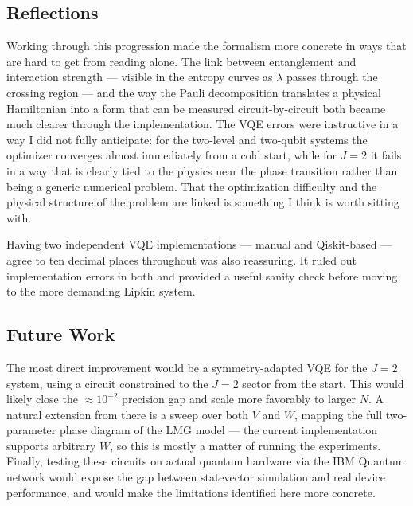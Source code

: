 \subsection{Reflections}
\label{subsec:conclusion-reflections}

Working through this progression made the formalism more concrete in ways that are hard to get from reading alone. The link between entanglement and interaction strength — visible in the entropy curves as $\lambda$ passes through the crossing region — and the way the Pauli decomposition translates a physical Hamiltonian into a form that can be measured circuit-by-circuit both became much clearer through the implementation. The VQE errors were instructive in a way I did not fully anticipate: for the two-level and two-qubit systems the optimizer converges almost immediately from a cold start, while for $J=2$ it fails in a way that is clearly tied to the physics near the phase transition rather than being a generic numerical problem. That the optimization difficulty and the physical structure of the problem are linked is something I think is worth sitting with.

Having two independent VQE implementations — manual and Qiskit-based — agree to ten decimal places throughout was also reassuring. It ruled out implementation errors in both and provided a useful sanity check before moving to the more demanding Lipkin system.

\subsection{Future Work}
\label{subsec:conclusion-future-work}

The most direct improvement would be a symmetry-adapted VQE for the $J=2$ system, using a circuit constrained to the $J=2$ sector from the start. This would likely close the $\approx10^{-2}$ precision gap and scale more favorably to larger $N$. A natural extension from there is a sweep over both $V$ and $W$, mapping the full two-parameter phase diagram of the LMG model — the current implementation supports arbitrary $W$, so this is mostly a matter of running the experiments. Finally, testing these circuits on actual quantum hardware via the IBM Quantum network would expose the gap between statevector simulation and real device performance, and would make the limitations identified here more concrete.

